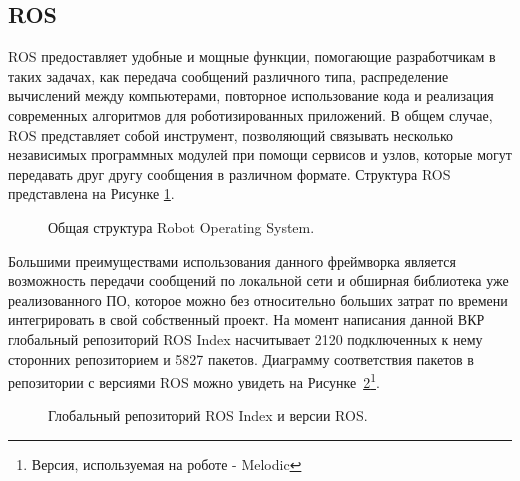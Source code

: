 \subsection{ROS}
ROS предоставляет удобные и мощные функции, помогающие разработчикам в таких задачах, как передача сообщений различного типа, распределение вычислений между компьютерами, повторное использование кода и реализация современных алгоритмов для роботизированных приложений\cite[с. 7]{joseph2018mastering}. В общем случае, ROS представляет собой инструмент, позволяющий связывать несколько независимых программных модулей при помощи сервисов и узлов, которые могут передавать друг другу сообщения в различном формате. Структура ROS представлена на Рисунке \ref{fig:ros-compute-graph}\cite[с. 19]{joseph2018mastering}.

\begin{figure}[ht]
  \caption{Общая структура Robot Operating System.}\label{fig:ros-compute-graph}
\end{figure}


Большими преимуществами использования данного фреймворка является возможность передачи сообщений по локальной сети и обширная библиотека уже реализованного ПО, которое можно без относительно больших затрат по времени интегрировать в свой собственный проект. На момент написания данной ВКР глобальный репозиторий ROS Index насчитывает 2120 подключенных к нему сторонних репозиторием и 5827 пакетов. Диаграмму соответствия пакетов в репозитории с версиями ROS можно увидеть на Рисунке~\ref{fig:ros-index}\footnote{Версия, используемая на роботе - Melodic}\cite{ros-index-stats}.

\begin{figure}[ht]
  \caption{Глобальный репозиторий ROS Index и версии ROS.}\label{fig:ros-index}
\end{figure}

